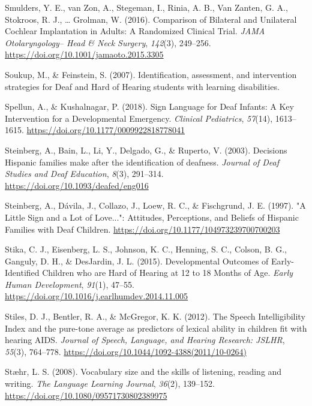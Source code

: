 \documentclass[
  english,
  man]{apa6}
\begin{document}
\leavevmode\hypertarget{ref-smulders2016}{}%
Smulders, Y. E., van Zon, A., Stegeman, I., Rinia, A. B., Van Zanten, G. A., Stokroos, R. J., \ldots{} Grolman, W. (2016). Comparison of Bilateral and Unilateral Cochlear Implantation in Adults: A Randomized Clinical Trial. \emph{JAMA Otolaryngology-- Head \& Neck Surgery}, \emph{142}(3), 249--256. \url{https://doi.org/10.1001/jamaoto.2015.3305}

\leavevmode\hypertarget{ref-soukup2007}{}%
Soukup, M., \& Feinstein, S. (2007). Identification, assessment, and intervention strategies for Deaf and Hard of Hearing students with learning disabilities.

\leavevmode\hypertarget{ref-spellun2018}{}%
Spellun, A., \& Kushalnagar, P. (2018). Sign Language for Deaf Infants: A Key Intervention for a Developmental Emergency. \emph{Clinical Pediatrics}, \emph{57}(14), 1613--1615. \url{https://doi.org/10.1177/0009922818778041}

\leavevmode\hypertarget{ref-steinberg2003}{}%
Steinberg, A., Bain, L., Li, Y., Delgado, G., \& Ruperto, V. (2003). Decisions Hispanic families make after the identification of deafness. \emph{Journal of Deaf Studies and Deaf Education}, \emph{8}(3), 291--314. \url{https://doi.org/10.1093/deafed/eng016}

\leavevmode\hypertarget{ref-steinberg1997}{}%
Steinberg, A., Dávila, J., Collazo, J., Loew, R. C., \& Fischgrund, J. E. (1997). "A Little Sign and a Lot of Love...": Attitudes, Perceptions, and Beliefs of Hispanic Families with Deaf Children. \url{https://doi.org/10.1177/104973239700700203}

\leavevmode\hypertarget{ref-stika2015}{}%
Stika, C. J., Eisenberg, L. S., Johnson, K. C., Henning, S. C., Colson, B. G., Ganguly, D. H., \& DesJardin, J. L. (2015). Developmental Outcomes of Early-Identified Children who are Hard of Hearing at 12 to 18 Months of Age. \emph{Early Human Development}, \emph{91}(1), 47--55. \url{https://doi.org/10.1016/j.earlhumdev.2014.11.005}

\leavevmode\hypertarget{ref-stiles2012}{}%
Stiles, D. J., Bentler, R. A., \& McGregor, K. K. (2012). The Speech Intelligibility Index and the pure-tone average as predictors of lexical ability in children fit with hearing AIDS. \emph{Journal of Speech, Language, and Hearing Research: JSLHR}, \emph{55}(3), 764--778. \url{https://doi.org/10.1044/1092-4388(2011/10-0264)}

\leavevmode\hypertarget{ref-staehr2008}{}%
Stæhr, L. S. (2008). Vocabulary size and the skills of listening, reading and writing. \emph{The Language Learning Journal}, \emph{36}(2), 139--152. \url{https://doi.org/10.1080/09571730802389975}
\end{document}
